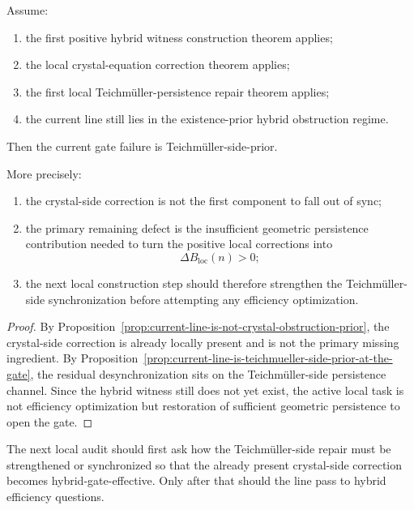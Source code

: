 \begin{theorem}
\label{thm:first-gate-side-desynchronization-orientation-theorem}
Assume:
\begin{enumerate}[leftmargin=2em,label=(\alph*)]
 \item the first positive hybrid witness construction theorem applies;
 \item the local crystal-equation correction theorem applies;
 \item the first local Teichm\"uller-persistence repair theorem applies;
 \item the current line still lies in the existence-prior hybrid obstruction regime.
\end{enumerate}
Then the current gate failure is Teichm\"uller-side-prior.

More precisely:
\begin{enumerate}[leftmargin=2em,label=(\roman*)]
 \item the crystal-side correction is not the first component to fall out of sync;
 \item the primary remaining defect is the insufficient geometric persistence contribution needed to turn the positive local corrections into
 \[
 \Delta B_{\mathrm{loc}}(n)>0;
 \]
 \item the next local construction step should therefore strengthen the Teichm\"uller-side synchronization before attempting any efficiency optimization.
\end{enumerate}
\end{theorem}

\begin{proof}
By Proposition~\ref{prop:current-line-is-not-crystal-obstruction-prior}, the crystal-side correction is already locally present and is not the primary missing ingredient.
By Proposition~\ref{prop:current-line-is-teichmueller-side-prior-at-the-gate}, the residual desynchronization sits on the Teichm\"uller-side persistence channel.
Since the hybrid witness still does not yet exist, the active local task is not efficiency optimization but restoration of sufficient geometric persistence to open the gate.
\end{proof}

\begin{corollary}
\label{cor:current-gate-side-working-rule}
The next local audit should first ask how the Teichm\"uller-side repair must be strengthened or synchronized so that the already present crystal-side correction becomes hybrid-gate-effective.
Only after that should the line pass to hybrid efficiency questions.
\end{corollary}

